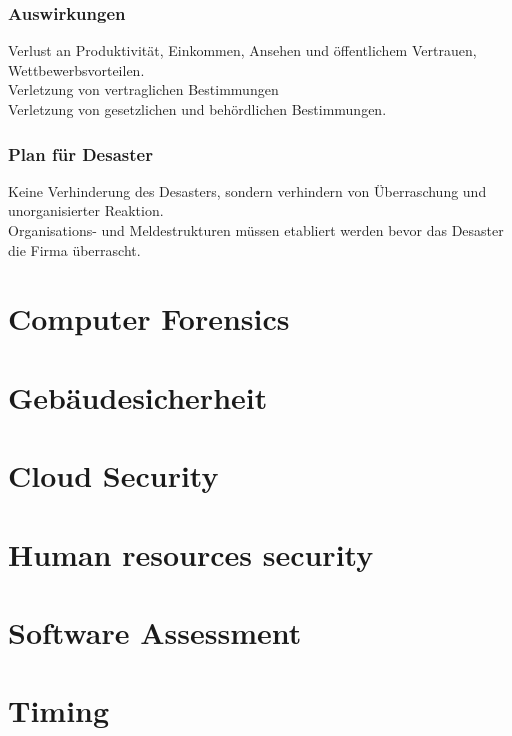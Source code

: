\documentclass{article} %
\begin{document}
\subsubsection{Auswirkungen}
Verlust an Produktivität, Einkommen, Ansehen und öffentlichem Vertrauen, Wettbewerbsvorteilen.\\
Verletzung von vertraglichen Bestimmungen\\
Verletzung von gesetzlichen und behördlichen Bestimmungen.\\
\subsubsection{Plan für Desaster}
Keine Verhinderung des Desasters, sondern verhindern von Überraschung und unorganisierter Reaktion.\\
Organisations- und Meldestrukturen müssen etabliert werden bevor das Desaster die Firma überrascht.

\section{Computer Forensics}
\section{Gebäudesicherheit}
\section{Cloud Security}
\section{Human resources security}
\section{Software Assessment}
\section{Timing}
\end{document}
